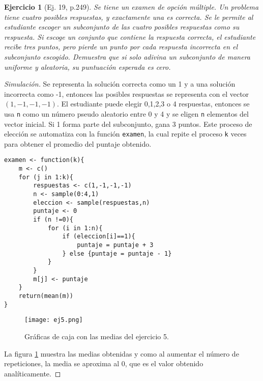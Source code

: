\documentclass[12pt,letterpaper]{article}
\newtheorem{ej}{Ejercicio}
\begin{document}
\begin{ej}[Ej. 19, p.249]
Se tiene un examen de opción múltiple. Un problema tiene cuatro posibles respuestas, y exactamente una es correcta. Se le permite al estudiante escoger un subconjunto de las cuatro posibles respuestas como su respuesta. Si escoge un conjunto que contiene la respuesta correcta, el estudiante recibe tres puntos, pero pierde un punto por cada respuesta incorrecta en el subconjunto escogido. Demuestra que si solo adivina un subconjunto de manera uniforme y aleatoria, su puntuación esperada es cero. 
\end{ej}

\begin{proof}[Simulación] 
Se representa la solución correcta como un 1 y a una solución incorrecta como -1, entonces las posibles respuestas se representa con el vector $(1,-1,-1,-1)$. El estudiante puede elegir 0,1,2,3 o 4 respuestas, entonces se usa \texttt{n} como un número pseudo aleatorio entre 0 y 4 y se eligen \texttt{n} elementos del vector inicial. Si 1 forma parte del subconjunto, gana 3 puntos. Este proceso de elección se automatiza con la función \texttt{examen}, la cual repite el proceso \texttt{k} veces para obtener el promedio del puntaje obtenido.
\begin{lstlisting}
examen <- function(k){
    m <- c()
    for (j in 1:k){
        respuestas <- c(1,-1,-1,-1)
        n <- sample(0:4,1)
        eleccion <- sample(respuestas,n)
        puntaje <- 0
        if (n !=0){
            for (i in 1:n){
                if (eleccion[i]==1){
                    puntaje = puntaje + 3
                } else {puntaje = puntaje - 1}
            }
        }
        m[j] <- puntaje
    }
    return(mean(m))
}
\end{lstlisting}
\begin{figure}
 	\centering 
 		\texttt{[image: ej5.png]} 		
 	 	\caption{Gráficas de caja con las medias del ejercicio 5.} 
 	 		\label{ej5}
\end{figure}
La figura \ref{ej5} muestra las medias obtenidas y como al aumentar el número de repeticiones, la media se aproxima al 0, que es el valor obtenido analíticamente.
\end{proof}


 

\end{document}
